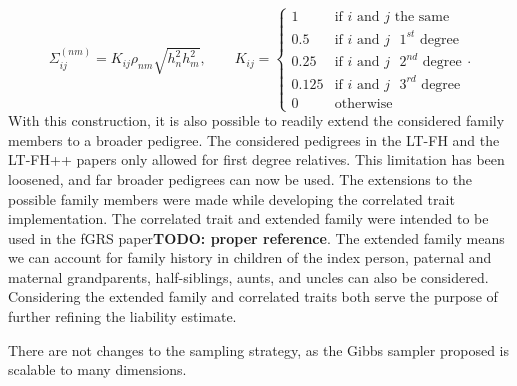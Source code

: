 \begin{equation*}
	\Sigma^{(nm)}_{ij} = K_{ij} \rho_{nm}\sqrt{h^2_{n}h^2_{m}}, \qquad K_{ij} = 
	\begin{cases} 
		1 		& \text{if } i \text{ and } j \text{ the same} \\
		0.5 	& \text{if } i \text{ and } j \text{ $1^{st}$ degree} \\
		0.25 	& \text{if } i \text{ and } j \text{ $2^{nd}$ degree} \\ 
		0.125 	& \text{if } i \text{ and } j \text{ $3^{rd}$ degree}  \\
		0 		& \text{otherwise}
	\end{cases}.
\end{equation*}
With this construction, it is also possible to readily extend the considered family members to a broader pedigree. The considered pedigrees in the LT-FH and the LT-FH++ papers only allowed for first degree relatives. This limitation has been loosened, and far broader pedigrees can now be used. The extensions to the possible family members were made while developing the correlated trait implementation. The correlated trait and extended family were intended to be used in the fGRS paper\textbf{TODO: proper reference}. The extended family means we can account for family history in children of the index person, paternal and maternal grandparents, half-siblings, aunts, and uncles can also be considered. Considering the extended family and correlated traits both serve the purpose of further refining the liability estimate.

There are not changes to the sampling strategy, as the Gibbs sampler proposed is scalable to many dimensions.
